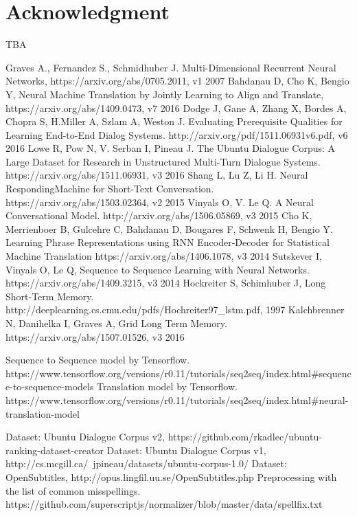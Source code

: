\documentclass{article} %
\begin{document}
\section{Acknowledgment}
TBA
\begin{thebibliography}{1}
Graves A., Fernandez S., Schmidhuber J. Multi-Dimensional Recurrent Neural Networks, https://arxiv.org/abs/0705.2011, v1 2007
Bahdanau D, Cho K, Bengio Y, Neural Machine Translation by Jointly Learning to Align and Translate,  https://arxiv.org/abs/1409.0473, v7 2016
Dodge J, Gane A, Zhang X, Bordes A, Chopra S, H.Miller A, Szlam A, Weston J.
Evaluating Prerequisite Qualities for Learning End-to-End Dialog Systems. http://arxiv.org/pdf/1511.06931v6.pdf, v6 2016
Lowe R, Pow N, V. Serban I, Pineau J. The Ubuntu Dialogue Corpus: A Large Dataset for Research in Unstructured Multi-Turn Dialogue Systems. https://arxiv.org/abs/1511.06931, v3 2016
Shang L, Lu Z, Li H. Neural RespondingMachine for Short-Text Conversation. https://arxiv.org/abs/1503.02364, v2 2015
Vinyals O, V. Le Q. A Neural Conversational Model. http://arxiv.org/abs/1506.05869, v3 2015
Cho K, Merrienboer B, Gulcehre C, Bahdanau D, Bougares F, Schwenk H, Bengio Y. Learning Phrase Representations using RNN Encoder-Decoder for Statistical Machine Translation https://arxiv.org/abs/1406.1078, v3 2014
Sutskever I, Vinyals O, Le Q, Sequence to Sequence Learning with Neural Networks. https://arxiv.org/abs/1409.3215, v3 2014
Hockreiter S, Schimhuber J, Long Short-Term Memory. http://deeplearning.cs.cmu.edu/pdfs/Hochreiter97\_lstm.pdf, 1997
Kalchbrenner N, Danihelka I, Graves A, Grid Long Term Memory.   https://arxiv.org/abs/1507.01526, v3 2016

Sequence to Sequence model by Tensorflow.   https://www.tensorflow.org/versions/r0.11/tutorials/seq2seq/index.html\#sequence-to-sequence-models
Translation model by Tensorflow. https://www.tensorflow.org/versions/r0.11/tutorials/seq2seq/index.html#neural-translation-model

Dataset: Ubuntu Dialogue Corpus v2, https://github.com/rkadlec/ubuntu-ranking-dataset-creator
Dataset: Ubuntu Dialogue Corpus v1, http://cs.mcgill.ca/~jpineau/datasets/ubuntu-corpus-1.0/
Dataset: OpenSubtitles, http://opus.lingfil.uu.se/OpenSubtitles.php
Preprocessing with the list of common misspellings. https://github.com/superscriptjs/normalizer/blob/master/data/spellfix.txt
\end{thebibliography}
\end{document}
